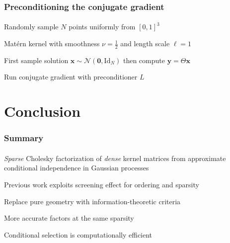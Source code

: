 \documentclass{beamer}                             %
\newcommand*{\N}{\mathcal{N}}
\renewcommand*{\vec}[1]{\bm{#1}}
\newcommand*{\Id}{\text{Id}}
\newcommand*{\CM}{\Theta}
\newenvironment{wideitemize}
  {\itemize\setlength{\itemsep}{0.5cm}}
  {\enditemize}
\begin{document}
\begin{frame}
\frametitle{Preconditioning the conjugate gradient}
\framesubtitle{}

\begin{wideitemize}
  \item Randomly sample \( N \) points uniformly from \( [0, 1]^3 \)
  \item Mat{\'e}rn kernel with smoothness \( \nu =
    \frac{1}{2} \) and length scale \( \ell = 1 \)
  \item First sample solution \( \vec{x} \sim \N(\vec{0},
    \Id_N) \) then compute \( \vec{y} = \CM \vec{x} \)
  \item Run conjugate gradient with preconditioner \( L \)
\end{wideitemize}


\begin{figure}[t]
  \centering
  
  \label{fig:cg_iter}
\end{figure}
\end{frame}

\section{Conclusion}

\begin{frame}
\frametitle{Summary}
\framesubtitle{}

\begin{wideitemize}
  \item \emph{Sparse} Cholesky factorization of \emph{dense} kernel
    matrices from approximate conditional independence in Gaussian processes
  \item Previous work exploits screening effect for ordering and sparsity
  \item Replace pure geometry with information-theoretic criteria
  \item More accurate factors at the same sparsity
  \item Conditional selection is computationally efficient
\end{wideitemize}
\end{frame}
\end{document}
